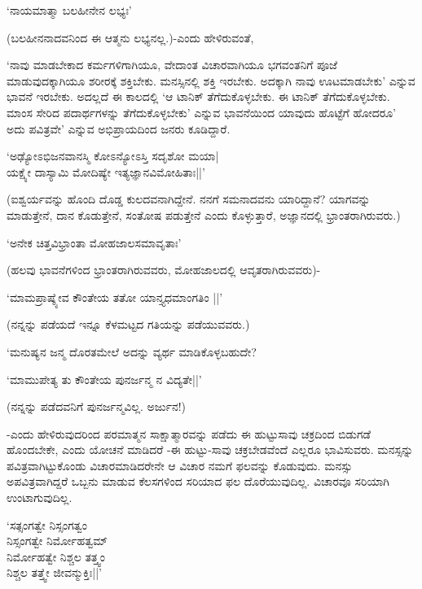 \begin{shloka}
`ನಾಯಮಾತ್ಮಾ ಬಲಹೀನೇನ ಲಭ್ಯಃ'
\end{shloka}

(ಬಲಹೀನನಾದವನಿಂದ ಈ ಆತ್ಮನು ಲಭ್ಯನಲ್ಲ.)-ಎಂದು ಹೇಳಿರುವಂತೆ,

`ನಾವು ಮಾಡಬೇಕಾದ ಕರ್ಮಗಳಿಗಾಗಿಯೂ, ವೇದಾಂತ ವಿಚಾರವಾಗಿಯೂ ಭಗವಂತನಿಗೆ ಪೂಜೆ ಮಾಡುವುದಕ್ಕಾಗಿಯೂ ಶರೀರಕ್ಕೆ ಶಕ್ತಿಬೇಕು. ಮನಸ್ಸಿನಲ್ಲಿ ಶಕ್ತಿ ಇರಬೇಕು. ಅದಕ್ಕಾಗಿ ನಾವು ಊಟಮಾಡಬೇಕು' ಎನ್ನುವ ಭಾವನೆ ಇರಬೇಕು. ಅದಲ್ಲದೆ ಈ ಕಾಲದಲ್ಲಿ `ಆ ಟಾನಿಕ್ ತೆಗೆದುಕೊಳ್ಳಬೇಕು. ಈ ಟಾನಿಕ್ ತೆಗೆದುಕೊಳ್ಳಬೇಕು. ಮಾಂಸ ಸೇರಿದ ಪದಾರ್ಥಗಳನ್ನು ತೆಗೆದುಕೊಳ್ಳಬೇಕು' ಎನ್ನುವ ಭಾವನೆಯಿಂದ ಯಾವುದು ಹೊಟ್ಟೆಗೆ ಹೋದರೂ' ಅದು ಪವಿತ್ರವೇ' ಎನ್ನುವ ಅಭಿಪ್ರಾಯದಿಂದ ಜನರು ಕೂಡಿದ್ದಾರೆ.

\begin{shloka}
`ಅಢ್ಯೋಽಭಿಜನವಾನಸ್ಮಿ ಕೋಽನ್ಯೋಽಸ್ತಿ ಸದೃಶೋ ಮಯಾ|\\
ಯಕ್ಷ್ಯೇ ದಾಸ್ಯಾಮಿ ಮೋದಿಷ್ಯೇ ಇತ್ಯಜ್ಞಾನವಿಮೋಹಿತಾಃ||'
\end{shloka}

(ಐಶ್ವರ್ಯವನ್ನು ಹೊಂದಿ ದೊಡ್ಡ ಕುಲದವನಾಗಿದ್ದೇನೆ. ನನಗೆ ಸಮನಾದವನು ಯಾರಿದ್ದಾನೆ? ಯಾಗವನ್ನು ಮಾಡುತ್ತೇನೆ, ದಾನ ಕೊಡುತ್ತೇನೆ, ಸಂತೋಷ ಪಡುತ್ತೇನೆ ಎಂದು ಕೊಳ್ಳುತ್ತಾರೆ, ಅಜ್ಞಾನದಲ್ಲಿ ಭ್ರಾಂತರಾಗಿರುವರು.)

\begin{shloka}
`ಅನೇಕ ಚಿತ್ತವಿಭ್ರಾಂತಾ ಮೋಹಜಾಲಸಮಾವೃತಾಃ'
\end{shloka}

(ಹಲವು ಭಾವನೆಗಳಿಂದ ಭ್ರಾಂತರಾಗಿರುವವರು, ಮೋಹಜಾಲದಲ್ಲಿ ಆವೃತರಾಗಿರುವವರು)-

\begin{shloka}
`ಮಾಮಪ್ರಾಷ್ಶ್ಯೇವ ಕೌಂತೇಯ ತತೋ ಯಾನ್ತ್ಯಧಮಾಂಗತಿಂ ||'
\end{shloka}

(ನನ್ನನ್ನು ಪಡೆಯದೆ ಇನ್ನೂ ಕೆಳಮಟ್ಟದ ಗತಿಯನ್ನು ಪಡೆಯುವವರು.)

`ಮನುಷ್ಯನ ಜನ್ಮ ದೊರತಮೇಲೆ ಅದನ್ನು ವ್ಯರ್ಥ ಮಾಡಿಕೊಳ್ಳಬಹುದೇ?

\begin{shloka}
`ಮಾಮುಪೇತ್ಯ ತು ಕೌಂತೇಯ ಪುನರ್ಜನ್ಮ ನ ವಿದ್ಯತೇ||'
\end{shloka}

(ನನ್ನನ್ನು ಪಡೆದವನಿಗೆ ಪುನರ್ಜನ್ಮವಿಲ್ಲ. ಅರ್ಜುನ!)

-ಎಂದು ಹೇಳಿರುವುದರಿಂದ ಪರಮಾತ್ಮನ ಸಾಕ್ಷಾತ್ಮಾರವನ್ನು ಪಡೆದು ಈ ಹುಟ್ಟುಸಾವು ಚಕ್ರದಿಂದ ಬಿಡುಗಡೆ ಹೊಂದಬೇಕೇ, ಎಂದು ಯೋಚನೆ ಮಾಡಿದರೆ -ಈ ಹುಟ್ಟು-ಸಾವು ಚಕ್ರಬೇಡವೆಂದೆ ಎಲ್ಲರೂ ಭಾವಿಸುವರು. ಮನಸ್ಸನ್ನು ಪವಿತ್ರವಾಗಿಟ್ಟುಕೊಂಡು ವಿಚಾರಮಾಡಿದರೇನೇ ಆ ವಿಚಾರ ನಮಗೆ ಫಲವನ್ನು ಕೊಡುವುದು. ಮನಸ್ಸು ಅಪವಿತ್ರವಾಗಿದ್ದರೆ ಒಬ್ಬನು ಮಾಡುವ ಕೆಲಸಗಳಿಂದ ಸರಿಯಾದ ಫಲ ದೊರೆಯುವುದಿಲ್ಲ. ವಿಚಾರವೂ ಸರಿಯಾಗಿ ಉಂಟಾಗುವುದಿಲ್ಲ.

\begin{shloka}
`ಸತ್ಸಂಗತ್ವೇ ನಿಸ್ಸಂಗತ್ವಂ\\
ನಿಸ್ಸಂಗತ್ವೇ ನಿರ್ಮೋಹತ್ವಮ್\\
ನಿರ್ಮೋಹತ್ವೇ ನಿಶ್ಚಲ ತತ್ತ್ವಂ\\
ನಿಶ್ಚಲ ತತ್ತ್ವೇ ಜೀವನ್ಮುಕ್ತಿಃ||'
\end{shloka}

